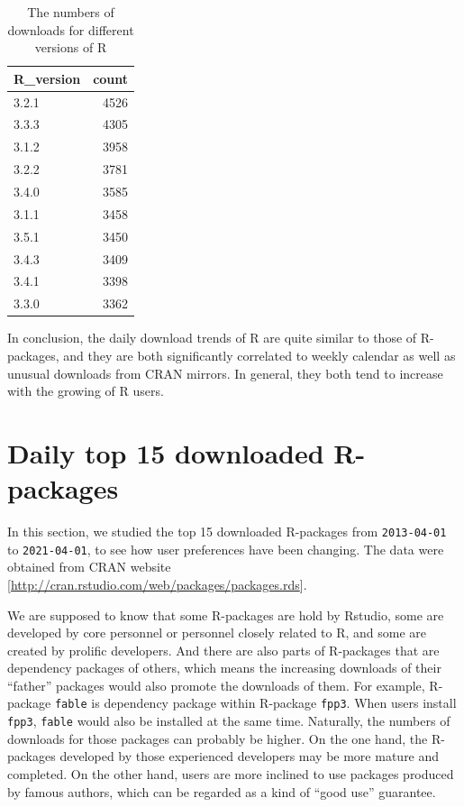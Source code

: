 \documentclass[
]{book}
\begin{document}
\begin{table}

\caption{\label{tab:R-download-trend-version}The numbers of downloads for different versions of R}
\centering
\begin{tabular}[t]{l|r}
\hline
R\_version & count\\
\hline
3.2.1 & 4526\\
\hline
3.3.3 & 4305\\
\hline
3.1.2 & 3958\\
\hline
3.2.2 & 3781\\
\hline
3.4.0 & 3585\\
\hline
3.1.1 & 3458\\
\hline
3.5.1 & 3450\\
\hline
3.4.3 & 3409\\
\hline
3.4.1 & 3398\\
\hline
3.3.0 & 3362\\
\hline
\end{tabular}
\end{table}

In conclusion, the daily download trends of R are quite similar to those of R-packages, and they are both significantly correlated to weekly calendar as well as unusual downloads from CRAN mirrors. In general, they both tend to increase with the growing of R users.

\hypertarget{daily-top-15-downloaded-r-packages}{%
\section{Daily top 15 downloaded R-packages}\label{daily-top-15-downloaded-r-packages}}

In this section, we studied the top 15 downloaded R-packages from \texttt{2013-04-01} to \texttt{2021-04-01}, to see how user preferences have been changing. The data were obtained from CRAN website {[}\url{http://cran.rstudio.com/web/packages/packages.rds}{]}.

We are supposed to know that some R-packages are hold by Rstudio, some are developed by core personnel or personnel closely related to R, and some are created by prolific developers\autocite{revolutions}. And there are also parts of R-packages that are dependency packages of others, which means the increasing downloads of their ``father'' packages would also promote the downloads of them. For example, R-package \texttt{fable} is dependency package within R-package \texttt{fpp3}. When users install \texttt{fpp3}, \texttt{fable} would also be installed at the same time. Naturally, the numbers of downloads for those packages can probably be higher. On the one hand, the R-packages developed by those experienced developers may be more mature and completed. On the other hand, users are more inclined to use packages produced by famous authors, which can be regarded as a kind of ``good use'' guarantee.
\end{document}
